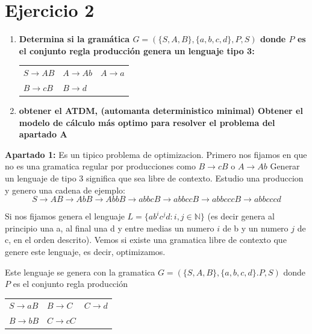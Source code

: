 \documentclass{article}
\begin{document}
        \section*{Ejercicio 2}
        \begin{enumerate}
            \item \textbf{Determina si la gramática $G = (\{S,A,B\}, \{a,b,c,d\}, P,S)$ donde $P$ es el conjunto regla producción
            genera un lenguaje tipo 3:}
            
            \begin{tabularx}{\textwidth}{XXX}
                $S \rightarrow AB$ & $A \rightarrow Ab$ & $A \rightarrow a$\\
                $B \rightarrow cB$ & $B \rightarrow d$\\
            \end{tabularx}
            
            \item \textbf{obtener el ATDM, (automanta deterministico minimal)
            Obtener el modelo de cálculo más optimo para resolver el problema del apartado A}
        \end{enumerate}
        

        \textbf{Apartado 1:}
        Es un tipico problema de optimizacion. Primero nos fijamos en que no es una gramatica regular por producciones
        como $B \rightarrow cB$ o $A \rightarrow Ab$
        Generar un lenguaje de tipo 3 significa que sea libre de contexto.
        Estudio una produccion y genero una cadena de ejemplo:
        $$ S \rightarrow AB \rightarrow AbB \rightarrow AbbB \rightarrow abbcB \rightarrow abbccB \rightarrow abbcccB \rightarrow abbcccd$$ 

        Si nos fijamos genera el lenguaje $L = \{ab^ic^jd : i, j \in \mathbb{N}  \}$ (es decir genera al principio una a, al final una d y entre medias un numero $i$ de b y un numero $j$ de c, en el orden descrito). Vemos si existe una gramatica libre de contexto que genere este lenguaje,
        es decir, optimizamos.

        \vspace{\baselineskip} %
        Este lenguaje se genera con la gramatica $G = (\{S,A,B\}, \{a,b,c,d\}. P,S)$ donde $P$ es el conjunto regla producción
        \vspace{\baselineskip} %

        \begin{tabularx}{\textwidth}{XXX}
            $S \rightarrow aB$ & $B \rightarrow C$ & $C \rightarrow d$\\
            $B \rightarrow bB$ & $C \rightarrow cC$\\
        \end{tabularx}
\end{document}
